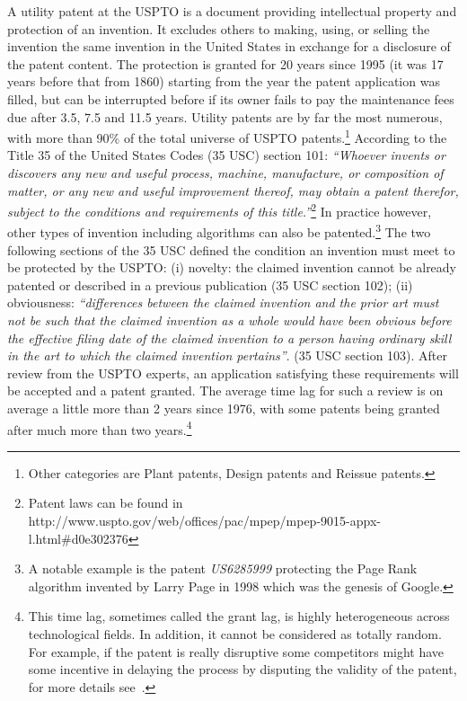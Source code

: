 \documentclass[12pt,twoside,a4paper]{article}
\begin{document}
A utility patent at the USPTO is a document providing intellectual property and protection of an invention. It excludes others to making, using, or selling the invention the same invention in the United States in exchange for a disclosure of the patent content. The protection is granted for 20 years since 1995 (it was 17 years before that from 1860) starting from the year the patent application was filled, but can be interrupted before if its owner fails to pay the maintenance fees due after 3.5, 7.5 and 11.5 years. Utility patents are by far the most numerous, with more than 90\% of the total universe of USPTO patents.\footnote{Other categories are Plant patents, Design patents and Reissue patents.} According to the Title 35 of the United States Codes (35 USC) section 101: \textit{``Whoever invents or discovers any new and useful process, machine, manufacture, or composition of matter, or any new and useful improvement thereof, may obtain a patent therefor, subject to the conditions and requirements of this title.''}\footnote{%
Patent laws can be found in http://www.uspto.gov/web/offices/pac/mpep/mpep-9015-appx-l.html\#d0e302376} In practice however, other types of invention including algorithms can also be patented.\footnote{A notable example is the patent \textit{US6285999} protecting the Page Rank algorithm invented by Larry Page in 1998 which was the genesis of Google.} The two following sections of the 35 USC defined the condition an invention must meet to be protected by the USPTO: (i) novelty: the claimed invention cannot be already patented or described in a previous publication (35 USC section 102); (ii) obviousness: \textit{``differences between the claimed invention and the prior art must not be such that the claimed invention as a whole would have been obvious before the effective filing date of the claimed invention to a person having ordinary skill in the art to which the claimed invention pertains''}. (35 USC section 103). After review from the USPTO experts, an application satisfying these requirements will be accepted and a patent granted. The average time lag for such a review is on average a little more than 2 years since 1976, with some patents being granted after much more than two years.\footnote{This time lag, sometimes called the grant lag, is highly heterogeneous across technological fields. In addition, it cannot be considered as totally random. For example, if the patent is really disruptive some competitors might have some incentive in delaying the process by disputing the validity of the patent, for more details see~\cite{regibeau2010}.}
\end{document}
